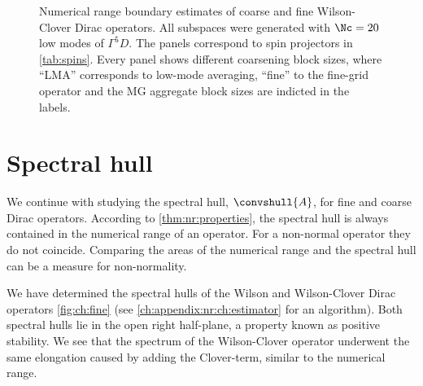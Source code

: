 \begin{figure}
\centering

\hfill
{}

\hfill
{}

\caption{
Numerical range boundary estimates of coarse and fine Wilson-Clover Dirac operators.
All subspaces were generated with $\Nc=20$ low modes of $\Gamma^{5} D$.
The panels correspond to spin projectors in \cref{tab:spins}.
Every panel shows different coarsening block sizes, where ``LMA'' corresponds to low-mode averaging, ``fine'' to the fine-grid operator and the MG aggregate block sizes are indicted in the labels.
}
\label{fig:nr:coarse}
\end{figure}

\section{Spectral hull}
\label{sec:chirality:sh}

We continue with studying the spectral hull, $\convshull{A}$, for fine and coarse Dirac operators.
According to \cref{thm:nr:properties}, the spectral hull is always contained in the numerical range of an operator.
For a non-normal operator they do not coincide.
Comparing the areas of the numerical range and the spectral hull can be a measure for non-normality.

We have determined the spectral hulls of the Wilson and Wilson-Clover Dirac operators \cref{fig:ch:fine} (see \cref{ch:appendix:nr:ch:estimator} for an algorithm).
Both spectral hulls lie in the open right half-plane, a property known as positive stability.
We see that the spectrum of the Wilson-Clover operator underwent the same elongation caused by adding the Clover-term, similar to the numerical range.

